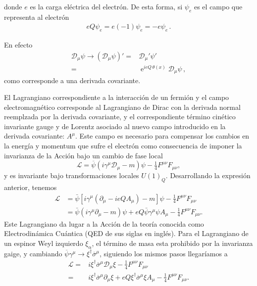donde $e$ es la carga eléctrica del electrón. De esta forma, si $\psi_e$ es el campo que representa al electrón
\begin{align}
  eQ \psi_e=e(-1)\psi_e=-e \psi_e\,.
\end{align}

En efecto
\begin{align}
  \mathcal{D}_{\mu}\psi\to \left( \mathcal{D}_{\mu}\psi \right)'=&\mathcal{D}_{\mu}'\psi' \nonumber\\
=&\operatorname{e}^{ieQ\, \theta(x)}\mathcal{D}_{\mu}\psi\,,
\end{align}
como corresponde a una derivada covariante.


El Lagrangiano correspondiente a la interacción de un fermión y el campo electromagnético corresponde al Lagrangiano de Dirac con la derivada normal reemplzada por la derivada covariante, y el correspondiente término cinético invariante gauge y de Lorentz asociado al nuevo campo introducido en la derivada covariante: $A^\mu$. Este campo es necesario para compensar los cambios en la energía y momentum que sufre el electrón como consecuencia de imponer la invarianza de la Acción bajo un cambio de fase local 
\begin{equation}
  \label{eq:201qft}
  \mathcal{L}=\overline{\psi}\left(i\gamma^\mu\mathcal{D}_\mu-m\right)\psi -\tfrac{1}{4}F^{\mu\nu}F_{\mu\nu},
\end{equation}
y es invariante bajo transformaciones locales $U(1)_Q$. Desarrollando la expresión anterior, tenemos
\begin{align}
    \mathcal{L}&=\bar{\psi}\left[i\gamma^\mu\left(\partial_\mu-ieQA_\mu\right)-m\right]\psi -\tfrac{1}{4}F^{\mu\nu}F_{\mu\nu}\nonumber\\
    &=\bar{\psi}\left(i\gamma^\mu\partial_\mu-m\right)\psi+eQ\bar{\psi}\gamma^\mu\psi A_\mu -\tfrac{1}{4}F^{\mu\nu}F_{\mu\nu}.
\end{align}
Este Lagrangiano da lugar a la Acción de la teoría conocida como Electrodinámica Cuántica (QED de sus siglas en inglés). Para el Lagrangiano de un espinor Weyl izquierdo $\xi_{\alpha}$, el término de masa esta prohibido por la invarianza gaige, y cambiando $\overline{\psi}\gamma^{\mu}\to \xi^{\dagger}\overline{\sigma}^{\mu}$, siguiendo los mismos pasos  llegaríamos a
\begin{align}
     \mathcal{L}=&i\xi^{\dagger}\overline{\sigma}^\mu\mathcal{D}_\mu\xi -\tfrac{1}{4}F^{\mu\nu}F_{\mu\nu} \nonumber\\
=&i\xi^{\dagger}\overline{\sigma}^\mu\partial_\mu\xi+eQ\xi^{\dagger}\overline{\sigma}^\mu\xi A_\mu -\tfrac{1}{4}F^{\mu\nu}F_{\mu\nu}.
\end{align}


